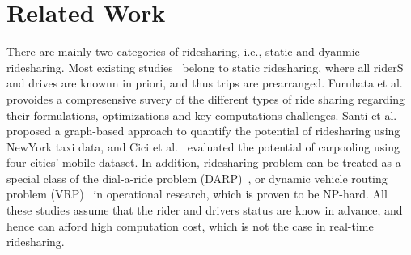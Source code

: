 \section{Related Work}

There are mainly two categories of ridesharing, i.e., static and dyanmic ridesharing. Most existing studies~\cite{FuruhataTRB13, Santi14, CiciUbicom14} belong to static ridesharing, where all riderS and drives are knownn in priori, and thus trips are prearranged. Furuhata et al.~\cite{FuruhataTRB13} provoides a compresensive suvery of the different types of ride sharing regarding their formulations, optimizations and key computations challenges. Santi et al.~\cite{Santi14} proposed a graph-based approach to quantify the potential of ridesharing using NewYork taxi data, and Cici et al.~\cite{CiciUbicom14} evaluated the potential of carpooling using four cities' mobile dataset. In addition, ridesharing problem can be treated as a special class of the dial-a-ride problem (DARP)~\cite{Cordeau07}, or dynamic vehicle routing problem (VRP)~\cite{LiSstd15} in operational research, which is proven to be NP-hard. All these studies assume that the rider and drivers status are know in advance, and hence can afford high computation cost, which is not the case in real-time ridesharing.

